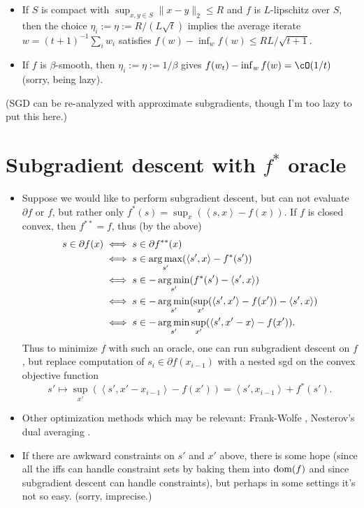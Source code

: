 \documentclass{article}
\newcommand{\red}[1]{{\color{red} #1}}
\def\dom{\textup{dom}}
\newcommand{\ip}[2]{\left\langle #1, #2 \right \rangle}
\newcommand{\argmax}{\operatornamewithlimits{arg\,max}}
\newcommand{\argmin}{\operatornamewithlimits{arg\,min}}
\begin{document}
\begin{itemize}
    \begin{itemize}
      \item
        If $S$ is compact with $\sup_{x,y\in S} \|x-y\|_2 \leq R$ and $f$ is $L$-lipschitz over $S$,
        then the choice $\eta_i := \eta := R / (L\sqrt{t})$ implies
        the average iterate $w = (t+1)^{-1} \sum_i w_i$ satisfies
        $f(w) - \inf_w f(w) \leq RL/\sqrt{t+1}$.

      \item
        If $f$ is $\beta$-smooth,
        then $\eta_i := \eta := 1/\beta$
        gives $f(w_t) - \inf_w f(w) = \cO(1/t)$ \red{(sorry, being lazy)}.
    \end{itemize}

    \red{(SGD can be re-analyzed with approximate subgradients, though I'm too lazy to put this here.)}

\end{itemize}


\section{Subgradient descent with $f^*$ oracle}

\begin{itemize}
  \item
    Suppose we would like to perform subgradient descent, but can not evaluate $\partial f$ or $f$,
    but rather only $f^*(s) = \sup_{x}(\ip{s}{x} - f(x))$.
    If $f$ is closed convex, then $f^{**} = f$, thus
    (by the above)
    \begin{align*}
      s \in \partial f(x)
      &\iff
      s \in \partial f^{**}(x)
      \\
      &\iff
      s \in \argmax_{s'} ( \ip{s'}{x} - f^*(s') )
      \\
      &\iff
      s \in -\argmin_{s'} ( f^*(s') - \ip{s'}{x} )
      \\
      &\iff
      s \in -\argmin_{s'} ( \sup_{x'}( \ip{s'}{x'} - f(x') ) - \ip{s'}{x} )
      \\
      &\iff
      s \in - \argmin_{s'} \sup_{x'} ( \ip{s'}{x'-x} - f(x') ).
    \end{align*}
    Thus to minimize $f$ with such an oracle, one can run subgradient descent on $f$,
    but replace computation of $s_i\in\partial f(x_{i-1})$ with a nested sgd on the convex objective function
    \[
      s' \mapsto \sup_{x'}(\ip{s'}{x'-x_{i-1}} - f(x'))
      = \ip{s'}{x_{i-1}} + f^*(s').
    \]

  \item
    Other optimization methods which may be relevant:
    Frank-Wolfe \citep[Section 3.3]{bubeck},
    Nesterov's dual averaging \citep[Section 4.4]{bubeck}.

  \item
    If there are awkward constraints on $s'$ and $x'$ above, there is some hope
    (since all the iffs can handle constraint sets by baking them into $\dom(f)$
    and since subgradient descent can handle constraints), but perhaps in some settings
    it's not so easy.
    \red{(sorry, imprecise.)}

\end{itemize}




\appendix
\end{document}
